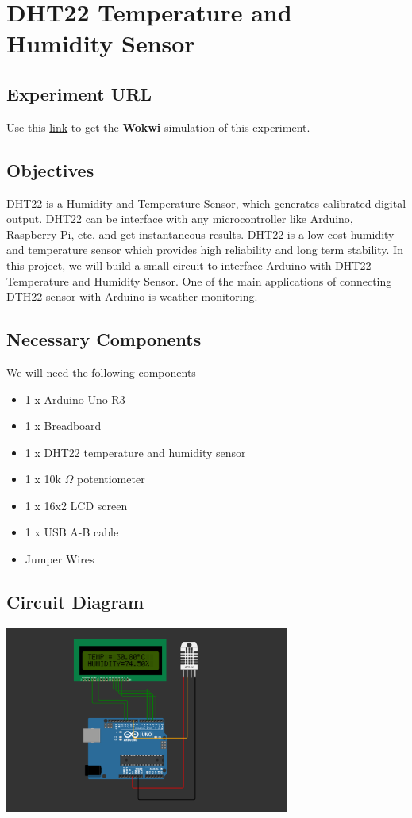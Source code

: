 \pagebreak\section{DHT22 Temperature and Humidity Sensor}
\subsection{Experiment URL}
    Use this \href{https://wokwi.com/projects/333082438824624723}{link} to get the \textbf{Wokwi} simulation of this experiment.
    
\subsection{Objectives}
DHT22 is a Humidity and Temperature Sensor, which generates calibrated digital output. DHT22 can be interface with any microcontroller like Arduino, Raspberry Pi, etc. and get instantaneous results. DHT22 is a low cost humidity and temperature sensor which provides high reliability and long term stability.
In this project, we will build a small circuit to interface Arduino with DHT22 Temperature and Humidity Sensor. One of the main applications of connecting DTH22 sensor with Arduino is weather monitoring.

\subsection{Necessary Components}
We will need the following components −
\begin{itemize}
\item 1 x Arduino Uno R3
\item 1 x Breadboard
\item 1 x DHT22 temperature and humidity sensor
\item 1 x 10k $\Omega$ potentiometer
\item 1 x 16x2 LCD screen
\item 1 x USB A-B cable
\item Jumper Wires
\end{itemize}

\subsection{Circuit Diagram}
            \begin{center}
            \includegraphics[width =0.7\textwidth]{images/dht22Circuit.png}
            \end{center}


